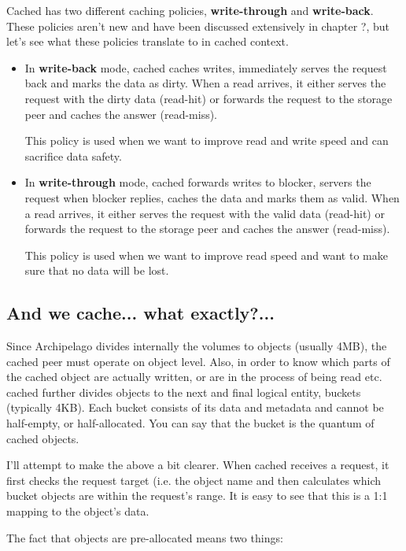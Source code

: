 Cached has two different caching policies, \textbf{write-through} and 
\textbf{write-back}. These policies aren't new and have been discussed 
extensively in chapter ?, but let's see what these policies translate to in 
cached context.

\begin{itemize}
	\item
		In \textbf{write-back} mode, cached caches writes, immediately 
		serves the request back and marks the data as dirty. When a read 
		arrives, it either serves the request with the dirty data 
		(read-hit) or forwards the request to the storage peer and 
		caches the answer (read-miss).

		This policy is used when we want to improve read and write speed 
		and can sacrifice data safety.
	\item
		In \textbf{write-through} mode, cached forwards writes to 
		blocker, servers the request when blocker replies, caches the 
		data and marks them as valid.  When a read arrives, it either 
		serves the request with the valid data (read-hit) or forwards 
		the request to the storage peer and caches the answer 
		(read-miss).

		This policy is used when we want to improve read speed and want 
		to make sure that no data will be lost.
\end{itemize}	

\subsection{And we cache... what exactly?...}

Since Archipelago divides internally the volumes to objects (usually 4MB), the 
cached peer must operate on object level. Also, in order to know which parts of 
the cached object are actually written, or are in the process of being read etc.  
cached further divides objects to the next and final logical entity, buckets 
(typically 4KB). Each bucket consists of its data and metadata and cannot be 
half-empty, or half-allocated. You can say that the bucket is the quantum of 
cached objects.

I'll attempt to make the above a bit clearer. When cached receives a request, it 
first checks the request target (i.e. the object name and then calculates which 
bucket objects are within the request's range. It is easy to see that this is a 
1:1 mapping to the object's data.

The fact that objects are pre-allocated means two things:

